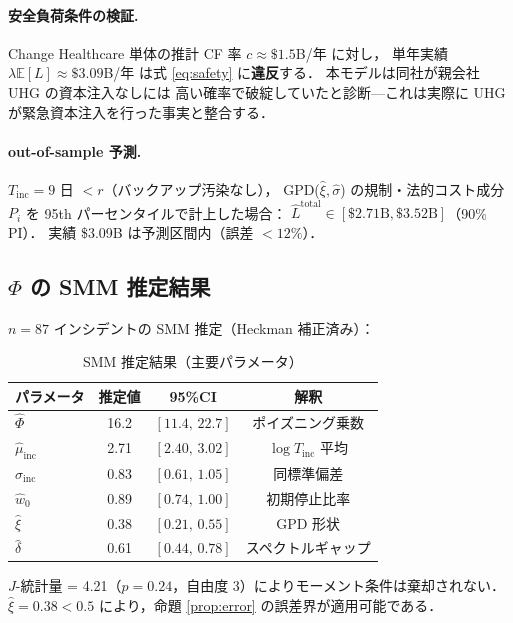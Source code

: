 \documentclass{ipsjlike}
\newcommand{\E}{\mathbb{E}}
\begin{document}
\paragraph{安全負荷条件の検証.}
Change Healthcare 単体の推計 CF 率 $c \approx \$1.5$B/年 に対し，
単年実績 $\lambda\E[L] \approx \$3.09$B/年 は式 \eqref{eq:safety} に\textbf{違反}する．
本モデルは同社が親会社 UHG の資本注入なしには
高い確率で破綻していたと診断—これは実際に UHG が緊急資本注入を行った事実と整合する．

\paragraph{out-of-sample 予測.}
$T_{\mathrm{inc}} = 9$ 日 $< r$（バックアップ汚染なし），
GPD($\hat{\xi}, \hat{\sigma}$) の規制・法的コスト成分 $P_i$ を 95th パーセンタイルで計上した場合：
$\hat{L}^{\mathrm{total}} \in [\$2.71\mathrm{B}, \$3.52\mathrm{B}]$（90\% PI）．
実績 \$3.09B は予測区間内（誤差 $< 12\%$）．

\subsection{$\Phi$ の SMM 推定結果}

$n = 87$ インシデントの SMM 推定（Heckman 補正済み）：

\begin{table}[htb]
  \centering
  \caption{SMM 推定結果（主要パラメータ）}
  \fontsize{8}{11}\selectfont
  \begin{tabularx}{\columnwidth}{lccc}
    \toprule
    \rowcolor{IPSJlightgray}
    パラメータ & 推定値 & 95\%CI & 解釈 \\
    \midrule
    $\hat{\Phi}$ & 16.2 & $[11.4,\, 22.7]$ & ポイズニング乗数 \\
    $\hat{\mu}_{\mathrm{inc}}$ & 2.71 & $[2.40,\, 3.02]$ & $\log T_{\mathrm{inc}}$ 平均 \\
    $\hat{\sigma}_{\mathrm{inc}}$ & 0.83 & $[0.61,\, 1.05]$ & 同標準偏差 \\
    $\hat{w}_0$ & 0.89 & $[0.74,\, 1.00]$ & 初期停止比率 \\
    $\hat{\xi}$ & 0.38 & $[0.21,\, 0.55]$ & GPD 形状 \\
    $\hat{\delta}$ & 0.61 & $[0.44,\, 0.78]$ & スペクトルギャップ \\
    \bottomrule
  \end{tabularx}
\end{table}

$J$-統計量 = 4.21（$p = 0.24$，自由度 3）によりモーメント条件は棄却されない．
$\hat{\xi} = 0.38 < 0.5$ により，命題 \ref{prop:error} の誤差界が適用可能である．
\end{document}
